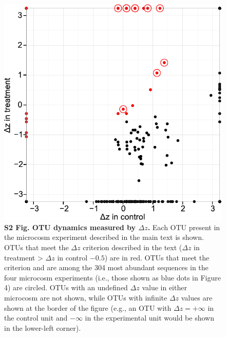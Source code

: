 \clearpage
\begin{figure}[ht]
\centering
\includegraphics{texmex/fig/fig_s2}
\caption*{{\bf S2 Fig. OTU dynamics measured by $\Delta z$.}
Each OTU present in the microcosm experiment described in the main text is
shown. OTUs that meet the $\Delta z$ criterion described in the text ($\Delta z$ in treatment >
$\Delta z$ in control $- 0.5$) are in red. OTUs that meet the criterion and are among
the 304 most abundant sequences in the four microcosm experiments (i.e., those
shown as blue dots in Figure 4) are circled. OTUs with an undefined $\Delta z$ value in
either microcosm are not shown, while OTUs with infinite $\Delta z$ values are shown at
the border of the figure (e.g., an OTU with $\Delta z = +\infty$ in the control unit and $-\infty$
in the experimental unit would be shown in the lower-left corner).}
\end{figure}

